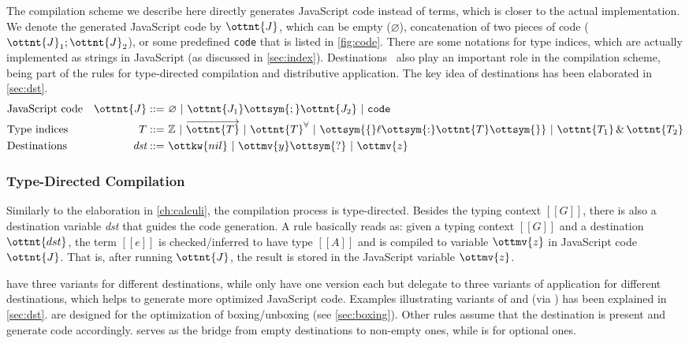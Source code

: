 \noindent
The compilation scheme we describe here directly generates JavaScript code
instead of \lambdar terms, which is closer to the actual implementation. We
denote the generated JavaScript code by $\ottnt{J}$, which can be empty
($\varnothing$), concatenation of two pieces of code
($\ottnt{J}_1;\ottnt{J}_2$), or some predefined \texttt{code} that is listed in
\autoref{fig:code}. There are some notations for type indices, which are
actually implemented as strings in JavaScript (as discussed in
\autoref{sec:index}). Destinations~\citep{shaikhha2017destination} also play an
important role in the compilation scheme, being part of the rules for
type-directed compilation and distributive application. The key idea of
destinations has been elaborated in \autoref{sec:dst}.
\begin{align*}
  &\text{JavaScript code}&\ottnt{J} ::=&~  \varnothing  ~|~ \ottnt{J_{{\mathrm{1}}}}  \ottsym{;}  \ottnt{J_{{\mathrm{2}}}} ~|~ \mathtt{code} \\
  &\text{Type indices}&           T ::=&~  \mathbb{Z}  ~|~  \overrightarrow{ \ottnt{T} }  ~|~  \ottnt{T} ^\forall  ~|~ \ottsym{\{}  \ell  \ottsym{:}  \ottnt{T}  \ottsym{\}} ~|~ \ottnt{T_{{\mathrm{1}}}}  \, \& \,  \ottnt{T_{{\mathrm{2}}}} \\
  &\text{Destinations}&\textit{dst} ::=&~ \ottkw{nil} ~|~ \ottmv{y}  \ottsym{\mbox{?}} ~|~ \ottmv{z}
\end{align*}

\subsubsection{Type-Directed Compilation}

Similarly to the elaboration in \autoref{ch:calculi}, the compilation process
is type-directed. Besides the typing context $[[G]]$, there is also a
destination variable \textit{dst} that guides the code generation. A rule
basically reads as: given a typing context $[[G]]$ and a destination
$\ottnt{dst}$, the \fiplus term $[[e]]$ is checked/inferred to have type $[[A]]$
and is compiled to variable $\ottmv{z}$ in JavaScript code $\ottnt{J}$. That is,
after running $\ottnt{J}$, the result is stored in the JavaScript variable
$\ottmv{z}$.

 have three variants for different destinations, while
 only have one version each but delegate to three variants of
application for different destinations, which helps to generate more optimized
JavaScript code. Examples illustrating variants of  and
 (via ) has been explained in \autoref{sec:dst}.
 are designed for the optimization of boxing/unboxing
(see \autoref{sec:boxing}). Other rules assume that the destination is present
and generate code accordingly.  serves as the bridge from empty
destinations to non-empty ones, while  is for optional ones.


